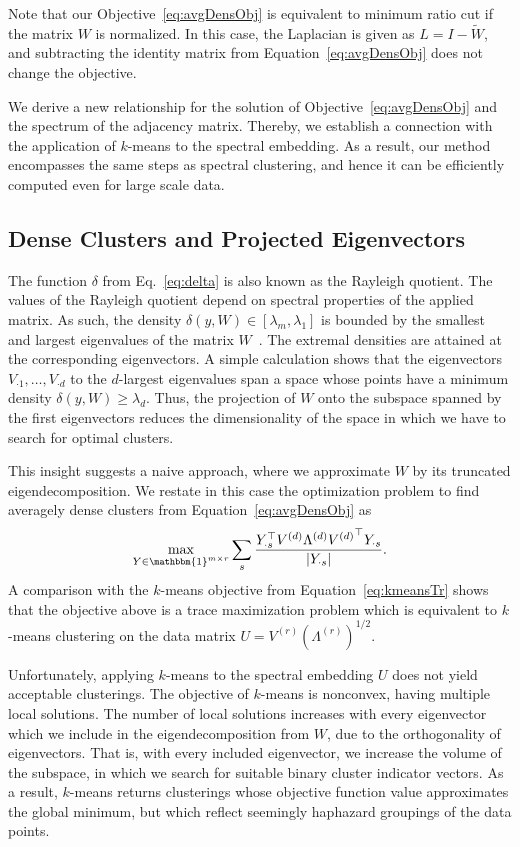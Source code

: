 Note that our Objective~\eqref{eq:avgDensObj} is equivalent to minimum ratio cut if the matrix $W$ is normalized. In this case, the Laplacian is given as $L=I-\tilde{W}$, and subtracting the identity matrix from Equation~\eqref{eq:avgDensObj} does not change the objective.

We derive a new relationship for the solution of Objective~\eqref{eq:avgDensObj} and the spectrum of the adjacency matrix. Thereby, we establish a connection with the application of $k$-means to the spectral embedding. As a result, our method encompasses the same steps as spectral clustering, and hence it can be efficiently computed even for large scale data. 
\subsection{Dense Clusters and Projected Eigenvectors}
The function $\delta$ from Eq.~\eqref{eq:delta} is also known as the Rayleigh quotient. The values of the Rayleigh quotient 
depend on spectral properties of the applied matrix. As such, the density $\delta(y,W)\in [\lambda_m,\lambda_1]$ is bounded by the smallest and largest eigenvalues of the matrix $W$~\citep{collatz1978spektren}. The extremal densities are attained at the corresponding eigenvectors. A simple calculation shows that the eigenvectors $V_{\cdot 1},\ldots,V_{\cdot d}$ to the $d$-largest eigenvalues span a space whose points have a minimum density $\delta(y,W)\geq\lambda_d$. 
Thus, the projection of $W$ onto the subspace spanned by the first eigenvectors reduces the dimensionality of the space in which we have to search for optimal clusters.

 This insight suggests a naive approach, where we approximate $W$ by its truncated eigendecomposition. We restate in this case the optimization problem to find averagely dense clusters from Equation~\eqref{eq:avgDensObj} as
\begin{align}\label{eq:approxTrunc}
\max_{Y\in\mathbbm{1}^{m\times r}} \sum_s \frac{Y_{\cdot s}^\top V^{(d)}\Lambda^{(d)} {V^{(d)}}^\top Y_{\cdot s}}{|Y_{\cdot s}|}.
\end{align}
A comparison with the $k$-means objective from Equation~\eqref{eq:kmeansTr} shows that the objective above is a trace maximization problem which is equivalent to $k$-means clustering on the data matrix $U=V^{(r)}\left(\Lambda^{(r)}\right)^{1/2}$. 

Unfortunately, applying $k$-means to the spectral embedding $U$ does not yield acceptable clusterings. The objective of $k$-means is nonconvex, having multiple local solutions. The number of local solutions increases with every eigenvector which we include in the eigendecomposition from $W$, due to the orthogonality of eigenvectors. That is, with every included eigenvector, we increase the volume of the subspace, in which we search for suitable binary cluster indicator vectors. As a result, $k$-means returns clusterings whose objective function value approximates the global minimum, but which reflect seemingly haphazard groupings of the data points.

